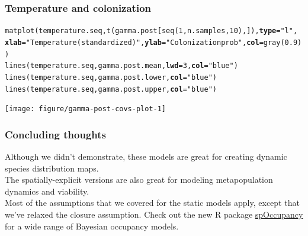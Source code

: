 \documentclass[color=usenames,dvipsnames,handout]{beamer}\usepackage[]{graphicx}\usepackage[]{xcolor}
\makeatletter
\newcommand{\hlnum}[1]{\textcolor[rgb]{0.69,0.494,0}{#1}}%
\newcommand{\hlsng}[1]{\textcolor[rgb]{0.749,0.012,0.012}{#1}}%
\newcommand{\hldef}[1]{\textcolor[rgb]{0,0,0}{#1}}%
\newcommand{\hlkwc}[1]{\textcolor[rgb]{0,0,0}{\textbf{#1}}}%
\newcommand{\hlkwd}[1]{\textcolor[rgb]{0.004,0.004,0.506}{#1}}%
\newenvironment{kframe}{%
 \def\at@end@of@kframe{}%
 \ifinner\ifhmode%
  \def\at@end@of@kframe{\end{minipage}}%
  \begin{minipage}{\columnwidth}%
 \fi\fi%
 \def\FrameCommand##1{\hskip\@totalleftmargin \hskip-\fboxsep
 \colorbox{shadecolor}{##1}\hskip-\fboxsep
     \hskip-\linewidth \hskip-\@totalleftmargin \hskip\columnwidth}%
 \MakeFramed {\advance\hsize-\width
   \@totalleftmargin\z@ \linewidth\hsize
   \@setminipage}}%
 {\par\unskip\endMakeFramed%
 \at@end@of@kframe}
\newenvironment{knitrout}{}{} %
\makeatother
\begin{document}
\begin{frame}[fragile]
  \frametitle{Temperature and colonization}
\begin{knitrout}\scriptsize
{}\color{fgcolor}\begin{kframe}
\begin{alltt}
\hlkwd{matplot}\hldef{(temperature.seq,} \hlkwd{t}\hldef{(gamma.post[}\hlkwd{seq}\hldef{(}\hlnum{1}\hldef{,n.samples,}\hlnum{10}\hldef{),]),} \hlkwc{type}\hldef{=}\hlsng{"l"}\hldef{,}
        \hlkwc{xlab}\hldef{=}\hlsng{"Temperature (standardized)"}\hldef{,} \hlkwc{ylab}\hldef{=}\hlsng{"Colonization prob"}\hldef{,} \hlkwc{col}\hldef{=}\hlkwd{gray}\hldef{(}\hlnum{0.9}\hldef{))}
\hlkwd{lines}\hldef{(temperature.seq, gamma.post.mean,} \hlkwc{lwd}\hldef{=}\hlnum{3}\hldef{,} \hlkwc{col}\hldef{=}\hlsng{"blue"}\hldef{)}
\hlkwd{lines}\hldef{(temperature.seq, gamma.post.lower,} \hlkwc{col}\hldef{=}\hlsng{"blue"}\hldef{)}
\hlkwd{lines}\hldef{(temperature.seq, gamma.post.upper,} \hlkwc{col}\hldef{=}\hlsng{"blue"}\hldef{)}
\end{alltt}
\end{kframe}

{\centering \texttt{[image: figure/gamma-post-covs-plot-1]} 

}


\end{knitrout}
\end{frame}







\begin{frame}
  \frametitle{Concluding thoughts}
  Although we didn't demonstrate, these models are great for creating
  dynamic species distribution maps. \\
  \pause
  \vfill
  The spatially-explicit versions are also great for modeling
  metapopulation dynamics and viability. \\
  \pause
  \vfill
  Most of the assumptions that we covered for the static models apply,
  except that we've relaxed the closure assumption.
  \pause
  \vfill
  Check out the new R package
  \href{https://www.jeffdoser.com/files/spoccupancy-web/}{spOccupancy}
  for a wide range of Bayesian occupancy models.
\end{frame}
\end{document}
